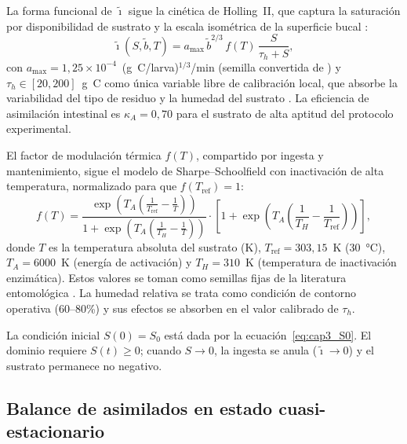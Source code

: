 La forma funcional de $\tilde{\imath}$ sigue la cinética de Holling~II, que captura la saturación por disponibilidad de sustrato y la escala isométrica de la superficie bucal \parencite{eriksenDynamicModellingFeed2022}:
\begin{equation}
    \tilde{\imath}(S, \tilde{b}, T) = a_{\max}\, \tilde{b}^{2/3}\, f(T)\, \frac{S}{\tau_h + S},
    \label{eq:cap3_holling}
\end{equation}
con $a_{\max} = 1{,}25 \times 10^{-4}$~(\si{\gram C}/larva)$^{1/3}$/\si{\minute} (semilla convertida de \textcite{eriksenDynamicModellingFeed2022}) y $\tau_h \in [20, 200]$~\si{\gram C} como única variable libre de calibración local, que absorbe la variabilidad del tipo de residuo y la humedad del sustrato \parencite{bekkerImpactSubstrateMoisture2021a}. La eficiencia de asimilación intestinal es $\kappa_A = 0{,}70$ para el sustrato de alta aptitud del protocolo experimental.

El factor de modulación térmica $f(T)$, compartido por ingesta y mantenimiento, sigue el modelo de Sharpe--Schoolfield con inactivación de alta temperatura, normalizado para que $f(T_{\mathrm{ref}})=1$:
\begin{equation}
    f(T) = \frac{\exp\!\left(T_A\left(\frac{1}{T_{\mathrm{ref}}} - \frac{1}{T}\right)\right)}{1 + \exp\!\left(T_A\left(\frac{1}{T_H} - \frac{1}{T}\right)\right)}
    \cdot \left[1 + \exp\!\left(T_A\left(\frac{1}{T_H} - \frac{1}{T_{\mathrm{ref}}}\right)\right)\right],
    \label{eq:cap3_sharpe_schoolfield}
\end{equation}
donde $T$ es la temperatura absoluta del sustrato (\si{\kelvin}), $T_{\mathrm{ref}} = 303{,}15$~\si{\kelvin} (\SI{30}{\celsius}), $T_A = 6000$~\si{\kelvin} (energía de activación) y $T_H = 310$~\si{\kelvin} (temperatura de inactivación enzimática). Estos valores se toman como semillas fijas de la literatura entomológica \parencite{nayakHermetiaIllucensDiptera2023,salamEffectDifferentEnvironmental2022}. La humedad relativa se trata como condición de contorno operativa ($60$--$80$\%) y sus efectos se absorben en el valor calibrado de $\tau_h$.

La condición inicial $S(0) = S_0$ está dada por la ecuación~\eqref{eq:cap3_S0}. El dominio requiere $S(t) \geq 0$; cuando $S \to 0$, la ingesta se anula ($\tilde{\imath} \to 0$) y el sustrato permanece no negativo.

\subsection{Balance de asimilados en estado cuasi-estacionario}
\label{subsec:cap3_ode_reserva}

